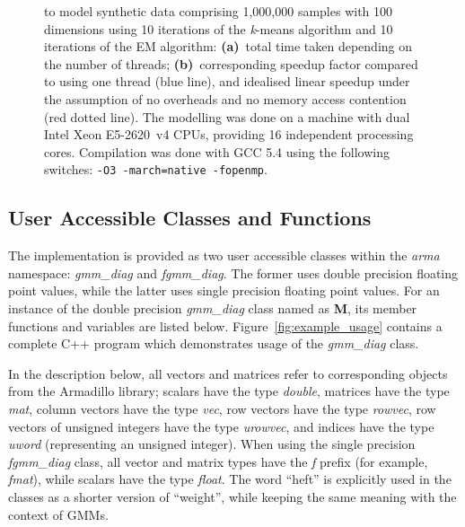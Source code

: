 \begin{figure}[!b]
{  to model synthetic data comprising 1,000,000 samples with 100 dimensions
  using 10 iterations of the {\it k}-means algorithm and 10 iterations of the EM algorithm:
  {\bf (a)}~total time taken depending on the number of threads;
  {\bf (b)}~corresponding speedup factor compared to using one thread (blue line), and idealised linear speedup under the assumption of no overheads and no memory access contention (red dotted line).
  The modelling was done on a machine with dual Intel Xeon E5-2620~v4 CPUs, providing 16 independent processing cores.
  Compilation was done with GCC 5.4 using the following switches: \texttt{-O3 -march=native -fopenmp}.
  }
\label{fig:speedup}
\end{figure}

\subsection{User Accessible Classes and Functions}

The implementation is provided as two user accessible classes within the {\it arma} namespace:
{\it gmm\_diag} and {\it fgmm\_diag}.
The former uses double precision floating point values, while the latter uses single precision floating point values.
For an instance of the double precision {\it gmm\_diag} class named as {\bf M},
its member functions and variables are listed below.
Figure~\ref{fig:example_usage} contains a complete C++ program which demonstrates usage of the {\it gmm\_diag} class.

In the description below, all vectors and matrices refer to corresponding objects from the Armadillo library;
scalars have the type {\it double},
matrices have the type {\it mat},
column vectors have the type {\it vec},
row vectors have the type {\it rowvec},
row vectors of unsigned integers have the type {\it urowvec},
and indices have the type {\it uword} (representing an unsigned integer).
When using the single precision {\it fgmm\_diag} class,
all vector and matrix types have the {\it f} prefix (for example, {\it fmat}),
while scalars have the type {\it float}.
The word ``heft'' is explicitly used in the classes as a shorter version of ``weight'', while keeping the same meaning with the context of GMMs.

